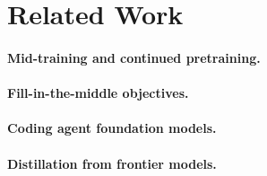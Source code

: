 \documentclass{article}
\begin{document}
%
%
%
\section{Related Work}
\label{sec:related}

\paragraph{Mid-training and continued pretraining.}

\paragraph{Fill-in-the-middle objectives.}

\paragraph{Coding agent foundation models.}

\paragraph{Distillation from frontier models.}
\end{document}

